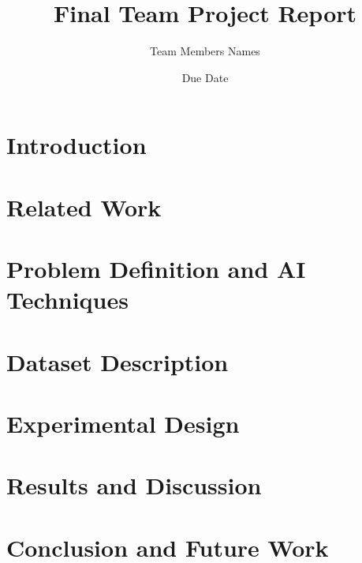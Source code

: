 \documentclass{article}
\title{Final Team Project Report}
\author{Team Members Names}
\date{Due Date}
\begin{document}


\maketitle

\section{Introduction}
\label{sec:introduction}

\section{Related Work}
\label{sec:related_work}

\section{Problem Definition and AI Techniques}
\label{sec:problem_definition_and_ai_techniques}

\section{Dataset Description}
\label{sec:dataset_description}

\section{Experimental Design}
\label{sec:experimental_design}

\section{Results and Discussion}
\label{sec:results_and_discussion}

\section{Conclusion and Future Work}
\label{sec:conclusion_and_future_work}
\end{document}
